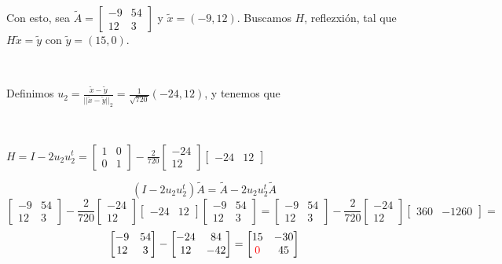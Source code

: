 \noindent Con esto, sea $\tilde{A} = \begin{bmatrix}
    -9 & 54 \\ 12 & 3
\end{bmatrix}$ y $\tilde{x} = (-9, 12)$. Buscamos $H$, reflezxión, tal que $H\tilde{x} = \tilde{y}$ con $\tilde{y} = (15,0)$.

\

\noindent Definimos $u_2 = \frac{\tilde{x} - \tilde{y}}{{||\tilde{x}- \tilde{y}||}_{2}} = \frac{1}{\sqrt{720}}(-24,12)$, y tenemos que

\

$H = I - 2u_{2}u_{2}^{t} = \begin{bmatrix}
    1 & 0 \\ 0 & 1
\end{bmatrix} - \frac{2}{720}\begin{bmatrix}
    -24 \\ 12
\end{bmatrix} \begin{bmatrix}
    -24 & 12
\end{bmatrix}$

\[(I- 2u_{2}u_{2}^{t})\tilde{A} = \tilde{A} - 2u_{2}u_{2}^{t}\tilde{A}\]
\[\begin{bmatrix}
    -9 & 54 \\ 12 & 3
\end{bmatrix} - \frac{2}{720}\begin{bmatrix}
    -24 \\ 12
\end{bmatrix}\begin{bmatrix}
    -24 & 12
\end{bmatrix}\begin{bmatrix}
    -9 & 54 \\ 12 & 3
\end{bmatrix} = 
\begin{bmatrix}
    -9 & 54 \\ 12 & 3
\end{bmatrix} - \frac{2}{720}\begin{bmatrix}
    -24 \\ 12
\end{bmatrix}\begin{bmatrix}
    360 & -1260
\end{bmatrix} = 
\]
\[
\begin{bmatrix}
    -9 & 54 \\ 12 & 3
\end{bmatrix} - \begin{bmatrix}
    -24 & 84 \\
    12 & -42
\end{bmatrix} = \begin{bmatrix}
    15 & -30 \\
    \textcolor{red}{0} & 45
\end{bmatrix}
\]


